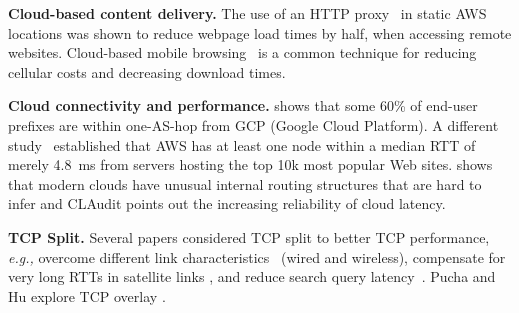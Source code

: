 \documentclass[10pt,sigconf]{acmart}
\newcommand{\mycomm}[3]{{\color{#2} \textbf{[#1: #3]}}}
\newcommand{\mycomm}[3]{}
\newcommand{\IK}[1]{\mycomm{IK}{blue}{#1}}
\providecommand{\eg}{\emph{e.g.,} }
\newcommand{\T}[1]{\smallskip\noindent\textbf{#1}} %
\begin{document}
\T{Cloud-based content delivery.} The use of an HTTP proxy~\cite{cgn2017} in static AWS locations was shown to reduce webpage load times by half, when accessing remote websites. Cloud-based mobile browsing~\cite{zhao2011reducing,wang2013accelerating} is a common technique for reducing cellular costs and decreasing download times.

\T{Cloud connectivity and performance.} \cite{one-hop} shows that some 60\% of end-user prefixes are within one-AS-hop from GCP (Google Cloud Platform). A different study~\cite{cgn2017} established that AWS has at least one node within a median RTT of merely 4.8~ms from servers hosting the top 10k most popular Web sites. \cite{unusual} shows that modern clouds have unusual internal routing structures that are hard to infer and CLAudit \cite{multidimensional} points out the increasing reliability of cloud latency. 

\T{TCP Split.} Several papers considered TCP split to better TCP performance, \eg overcome different link characteristics~ \cite{Kopparty2002} (wired and wireless), compensate for very long RTTs in satellite links \cite{luglio2004}, and reduce search query latency~\cite{pathak2010measuring}. 
Pucha and Hu explore TCP overlay \cite{pucha2005overlay, pucha2005slot}. 


\end{document}
